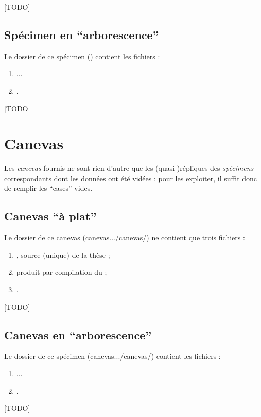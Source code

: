 [TODO]

\subsection{Spécimen en \enquote{arborescence}}
\label{sec-specimen-arborescence}

\def\subfolder{en-arborescence}

Le dossier de ce spécimen (\subdirectorytree) contient
les fichiers :
\begin{enumerate}
\item ...
\item {}\latexmkrc.
\end{enumerate}

[TODO]

\section{Canevas}
\label{sec-canevas}

Les \emph{canevas} fournis ne sont rien d'autre que les (quasi-)répliques des
\emph{spécimens} correspondants dont les données ont été vidées : pour les
exploiter, il suffit donc de remplir les \enquote{cases} vides.

\subsection{Canevas \enquote{à plat}}
\label{sec-canevas-a-plat}

\def\folder{canevas}
\def\subfolder{a-plat}

Le dossier de ce canevas (\folder{.../\folder/}\subdirectorytree) ne contient
que trois fichiers :
\begin{enumerate}
\item {}, source  (unique) de la thèse  ;
\item {} produit par compilation du  ;
\item {}\latexmkrc.
\end{enumerate}

[TODO]

\subsection{Canevas en \enquote{arborescence}}
\label{sec-canevas-arborescence}

\def\subfolder{en-arborescence}

Le dossier de ce spécimen (\folder{.../\folder/}\subdirectorytree) contient
les fichiers :
\begin{enumerate}
\item ...
\item {}\latexmkrc.
\end{enumerate}

[TODO]

%
\iffalse
\fi
